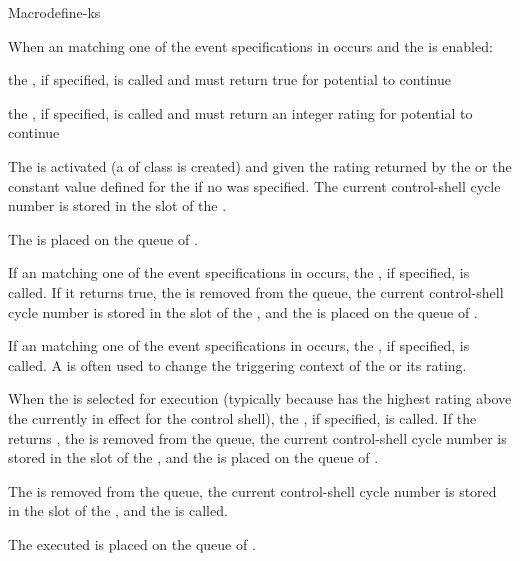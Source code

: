\documentclass[10pt,twoside,english,pdftex]{article}
\begin{document}
\begin{functiondoc}{Macro}{define-ks}
\begin{tightitemize}
\item When an  matching one of the event specifications in
   occurs and the  is enabled:
\begin{tightitemize}
\item the , if specified, is called and must
  return true for potential  to continue
\item the , if specified, is called and must
  return an integer rating for potential  to continue
\end{tightitemize}
\item The  is activated (a  of class
   is created) and given the rating returned by the
   or the constant  value defined for
  the  if no  was specified.  The
  current control-shell cycle number is stored in the 
  slot of the  .
\item The  is placed on the queue of
  .
\item If an  matching one of the event specifications in
   occurs, the , if
  specified, is called.  If it returns true, the  is
  removed from the  queue, the current
  control-shell cycle number is stored in the  slot of
  the , and the  is placed on the queue of
  .
\item If an  matching one of the event specifications in
   occurs, the , if
  specified, is called.  A  is often used to change
  the triggering context of the  or its rating.
%
\item When the  is selected for execution (typically
  because has the highest rating above the 
  currently in effect for the control shell), the
  , if specified, is called. If the
   returns \nil, the  is
  removed from the  queue, the current
  control-shell cycle number is stored in the  slot of
  the , and the is placed on the queue of
  .
\item The  is removed from the
   queue, the current control-shell cycle number
  is stored in the  slot of the 
  , and the  is called.
\item The executed  is placed on the queue of
  .
\end{tightitemize}


\end{functiondoc}
\end{document}
